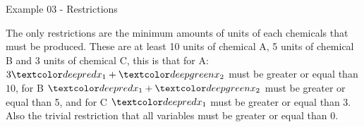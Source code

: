 \begin{frame}{Example 03 - Restrictions}

The only restrictions are the minimum amounts of units of each chemicals that
must be produced. These are at least 10 units of chemical A, 5 units of chemical
B and 3 units of chemical C, this is that for A: $3\colora{x_1} + \colorb{x_2}$
must be greater or equal than $10$, for B $\colora{x_1} + \colorb{x_2}$ must be
greater or equal than 5, and for C $\colora{x_1}$ must be greater or equal than
3. Also the trivial restriction that all variables must be greater or equal than
0.

\end{frame}
